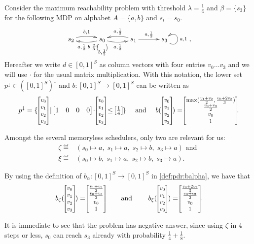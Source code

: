 \begin{example}\label{ex:pdr:shortheuristicforDecide}
	Consider the maximum reachability problem with threshold $\lambda = \frac{1}{4}$ and $\beta= \{s_3\}$ for the following MDP on alphabet $A=\{a,b\}$ and $s_\iota=s_0$.
	\begin{displaymath}
		\xymatrix@C=30pt{
		s_2\ar@/^1ex/[r]^{b,1} & s_0 \ar@(dr,dl)|{b,\frac{1}{3}} \ar@/^1ex/[l]^{a,\frac{1}{2}\; b,\frac{2}{3}} \ar@/_1ex/[r]_{a,\frac{1}{2}} &s_1 \ar@/_1ex/[l]_{a,\frac{1}{2}} \ar[r]^{a,\frac{1}{2}} &s_3 \ar@(rd, ru)_{a, 1}},
	\end{displaymath}
	Hereafter we write $d\in [0,1]^S$ as column vectors with four entries $v_0\dots v_3$
	and we will use $\cdot$ for the usual matrix multiplication.
	With this notation, the lower set $p^\downarrow \in ([0,1]^S)^\downarrow$ and $b\colon [0,1]^S \to [0,1]^S$ can be written as
	\[
	p^\downarrow = \{\,\cvec{v_0}{v_1}{v_2}{v_3} \mid {{ \!\begin{bmatrix} 1 & 0 & 0 &0 \end{bmatrix}\!}} \cdot \cvec{v_0}{v_1}{v_2}{v_3} \leq {{ \!\begin{bmatrix} \frac{1}{4}  \end{bmatrix}\!} } \} \quad \text{ and } \quad b (\, \cvec{v_0}{v_1}{v_2}{v_3} \,) =\cvec{\max(\frac{v_1+v_2}{2}, \frac{v_0+2v_2}{3})}{\frac{v_0+v_3}{2}}{v_0}{1}
	\textrm{.}
	\]

	Amongst the several memoryless schedulers, only two are relevant for us:
	\begin{align}
		\zeta \eqdef & ( s_0 \mapsto a ,\; s_1 \mapsto a ,\; s_2 \mapsto b ,\; s_3 \mapsto a )
		\text{  and }                                                                                \\
		\xi \eqdef   & (s_0 \mapsto b ,\; s_1 \mapsto a ,\; s_2 \mapsto b ,\; s_3 \mapsto a)\text{.}
	\end{align}

	By using the definition of $b_\alpha \colon [0,1]^S \to [0,1]^S$ in \eqref{def:pdr:balpha}, we have that
	\[
	b_\zeta (\, \cvec{v_0}{v_1}{v_2}{v_3} \,) =\cvec{\frac{v_1+v_2}{2}}{\frac{v_0+v_3}{2}}{v_0}{1}  \qquad \text{ and } \qquad b_\xi (\, \cvec{v_0}{v_1}{v_2}{v_3} \,) =\cvec{ \frac{v_0+2v_2}{3}}{\frac{v_0+v_3}{2}}{v_0}{1}\textrm{.}
	\]

	It is immediate to see that the problem has negative answer, since using $\zeta$ in $4$ steps or less, $s_0$ can reach $s_3$ already with probability $\frac{1}{4}+\frac{1}{8}$.


\end{example}
